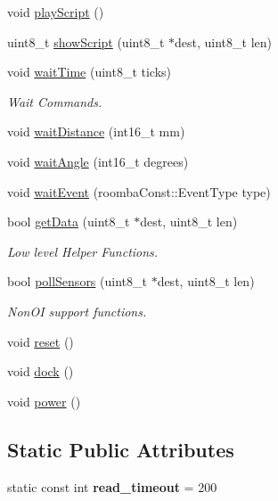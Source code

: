 \begin{DoxyCompactItemize}
void \hyperlink{class_arduino_roomba_a8f5bd40d2d4c26a314f2ee649d7605ae}{playScript} ()
\item 
uint8\_\-t \hyperlink{class_arduino_roomba_a12e3789abd74c01eac4e1f094edc0f8d}{showScript} (uint8\_\-t $\ast$dest, uint8\_\-t len)
\item 
void \hyperlink{class_arduino_roomba_a6ddfe1cb8fee12458d00e80b9ef68a19}{waitTime} (uint8\_\-t ticks)
\begin{DoxyCompactList}\small\item\em Wait Commands. \item\end{DoxyCompactList}\item 
void \hyperlink{class_arduino_roomba_a80daa425563387fab74ede7351981861}{waitDistance} (int16\_\-t mm)
\item 
void \hyperlink{class_arduino_roomba_a5eecc857d2d010f7c3ebaa75044f6349}{waitAngle} (int16\_\-t degrees)
\item 
void \hyperlink{class_arduino_roomba_a2a4f3f9a99d4102efef762745631f156}{waitEvent} (roombaConst::EventType type)
\item 
bool \hyperlink{class_arduino_roomba_a31c65b37a69092d98e86fbb8641d4c67}{getData} (uint8\_\-t $\ast$dest, uint8\_\-t len)
\begin{DoxyCompactList}\small\item\em Low level Helper Functions. \item\end{DoxyCompactList}\item 
bool \hyperlink{class_arduino_roomba_ac534f7f31042a034873264b6c0ebf0ad}{pollSensors} (uint8\_\-t $\ast$dest, uint8\_\-t len)
\begin{DoxyCompactList}\small\item\em NonOI support functions. \item\end{DoxyCompactList}\item 
void \hyperlink{class_arduino_roomba_a03f560265530b2dde866f111c547a271}{reset} ()
\item 
void \hyperlink{class_arduino_roomba_a36910b1173f76e1d09e3e2769ae07e5e}{dock} ()
\item 
void \hyperlink{class_arduino_roomba_af912edc527c77a7785861c061405c971}{power} ()
\end{DoxyCompactItemize}
\subsection*{Static Public Attributes}
\begin{DoxyCompactItemize}
\item 
\hypertarget{class_arduino_roomba_a42cc468013c3068764805c59b29e9ad1}{
static const int {\bfseries read\_\-timeout} = 200}
\label{class_arduino_roomba_a42cc468013c3068764805c59b29e9ad1}

\end{DoxyCompactItemize}


